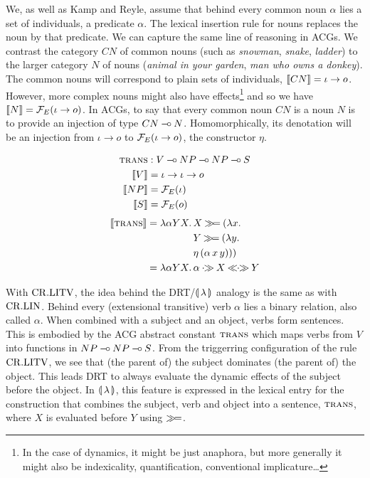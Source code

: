 \vspace{6mm}

We, as well as Kamp and Reyle, assume that behind every common noun
$\alpha$ lies a set of individuals, a predicate $\alpha$. The lexical
insertion rule for nouns replaces the noun by that predicate. We can
capture the same line of reasoning in ACGs. We contrast the category $CN$
of common nouns (such as \emph{snowman}, \emph{snake}, \emph{ladder}) to
the larger category $N$ of nouns (\emph{animal in your garden}, \emph{man
  who owns a donkey}). The common nouns will correspond to plain sets of
individuals, $\llbracket CN \rrbracket = \iota \to o$. However, more complex nouns might
also have effects\footnote{In the case of dynamics, it might be just
  anaphora, but more generally it might also be indexicality,
  quantification, conventional implicature\ldots}  and so we have
$\llbracket N \rrbracket = \mathcal{F}_E(\iota \to o)$. In ACGs, to say that every common noun $CN$
is a noun $N$ is to provide an injection of type $CN \mathbin{{-}\mkern-3.5mu{\circ}}
N$. Homomorphically, its denotation will be an injection from $\iota \to o$
to $\mathcal{F}_E(\iota \to o)$, the constructor $\eta$.

\vspace{6mm}

\begin{minipage}{0.5\textwidth}
\crlitvbox
\end{minipage}
\begin{minipage}{0.5\textwidth}
\begin{align*}
\textsc{trans} &: V \mathbin{{-}\mkern-3.5mu{\circ}} NP \mathbin{{-}\mkern-3.5mu{\circ}} NP \mathbin{{-}\mkern-3.5mu{\circ}} S \\
\llbracket V \rrbracket &= \iota \to \iota \to o \\
\llbracket NP \rrbracket &= \mathcal{F}_E(\iota) \\
\llbracket S \rrbracket &= \mathcal{F}_E(o)
\end{align*}
\begin{align*}
\sem{\abs{trans}} = \lam{\alpha Y X}{&X \hsbind (\lam{x}{ \\
                                     &Y \hsbind (\lam{y}{ \\
                                     &\etaE{(\app{\alpha}{x}{y})}})})} \\
                  = \lam{\alpha Y X}{&\alpha \apr X \aplr Y}
\end{align*}
\end{minipage}

\vspace{6mm}

With $\mathrm{CR.LITV}$, the idea behind the DRT/$\llparenthesis \, \lambda \, \rrparenthesis$ analogy is the
same as with $\mathrm{CR.LIN}$. Behind every (extensional transitive) verb $\alpha$
lies a binary relation, also called $\alpha$. When combined with a subject
and an object, verbs form sentences. This is embodied by the ACG abstract
constant $\textsc{trans}$ which maps verbs from $V$ into functions in
$NP \mathbin{{-}\mkern-3.5mu{\circ}} NP \mathbin{{-}\mkern-3.5mu{\circ}} S$. From the triggerring configuration of the rule
$\mathrm{CR.LITV}$, we see that (the parent of) the subject dominates (the parent
of) the object. This leads DRT to always evaluate the dynamic effects of
the subject before the object. In $\llparenthesis \, \lambda \, \rrparenthesis$, this feature is
expressed in the lexical entry for the construction that combines the
subject, verb and object into a sentence, $\textsc{trans}$, where $X$ is
evaluated before $Y$ using $\mathbin{\gg\!=}$.


